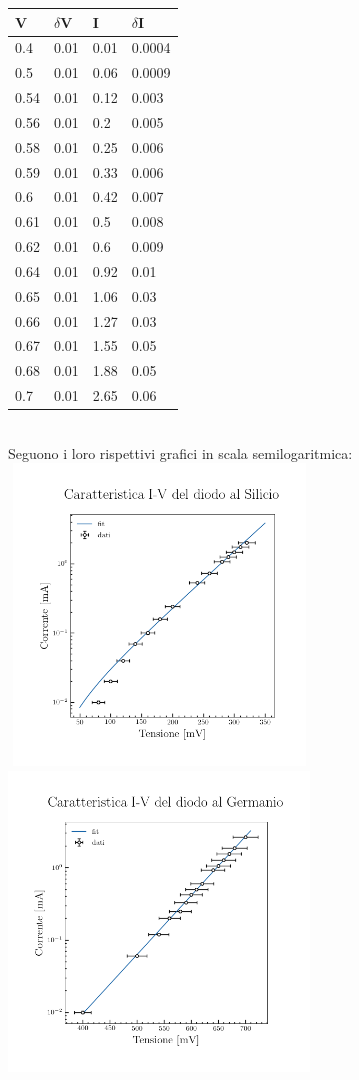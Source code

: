 \documentclass{article}
\begin{document}
    \begin{tabular}{|p{1cm}|p{1cm}|p{1cm}|p{1cm}|}
        \hline
        \textbf V & $\delta$V & I & $\delta$I \\
        \hline
        0.4 & 0.01 & 0.01 & 0.0004\\
        0.5 & 0.01 & 0.06 & 0.0009\\
        0.54 & 0.01 & 0.12 & 0.003\\
        0.56 & 0.01 & 0.2 & 0.005\\
        0.58 & 0.01 & 0.25 & 0.006\\
        0.59 & 0.01 & 0.33 & 0.006\\
        0.6 & 0.01 & 0.42 & 0.007\\
        0.61 & 0.01 & 0.5 & 0.008\\
        0.62 & 0.01 & 0.6 & 0.009\\
        0.64 & 0.01 & 0.92 & 0.01\\
        0.65 & 0.01 & 1.06 & 0.03\\
        0.66 & 0.01 & 1.27 & 0.03\\
        0.67 & 0.01 & 1.55 & 0.05\\
        0.68 & 0.01 & 1.88 & 0.05\\
        0.7 & 0.01 & 2.65 & 0.06\\
        \hline
    \end{tabular}\\
    Seguono i loro rispettivi grafici in scala semilogaritmica:\\
    \includegraphics[width = 8cm, height = 8cm]{silicio/grafico_silicio.png}
    \hspace{2cm}
    \includegraphics[width = 8cm, height = 8cm]{germanio/grafico_germanio.png}
\end{document}
